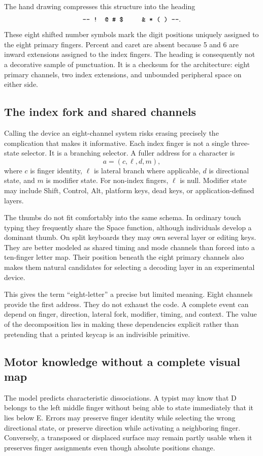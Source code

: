 \documentclass[11pt]{article}
\begin{document}
The hand drawing compresses this structure into the heading
\[
\texttt{--- ! @ \# \$ \qquad \& * ( ) ---}.
\]
These eight shifted number symbols mark the digit positions uniquely assigned to the eight primary fingers. Percent and caret are absent because 5 and 6 are inward extensions assigned to the index fingers. The heading is consequently not a decorative sample of punctuation. It is a checksum for the architecture: eight primary channels, two index extensions, and unbounded peripheral space on either side.

\subsection{The index fork and shared channels}

Calling the device an eight-channel system risks erasing precisely the complication that makes it informative. Each index finger is not a single three-state selector. It is a branching selector. A fuller address for a character is
\[
a=(c,\ell,d,m),
\]
where $c$ is finger identity, $\ell$ is lateral branch where applicable, $d$ is directional state, and $m$ is modifier state. For non-index fingers, $\ell$ is null. Modifier state may include Shift, Control, Alt, platform keys, dead keys, or application-defined layers.

The thumbs do not fit comfortably into the same schema. In ordinary touch typing they frequently share the Space function, although individuals develop a dominant thumb. On split keyboards they may own several layer or editing keys. They are better modeled as shared timing and mode channels than forced into a ten-finger letter map. Their position beneath the eight primary channels also makes them natural candidates for selecting a decoding layer in an experimental device.

This gives the term ``eight-letter'' a precise but limited meaning. Eight channels provide the first address. They do not exhaust the code. A complete event can depend on finger, direction, lateral fork, modifier, timing, and context. The value of the decomposition lies in making these dependencies explicit rather than pretending that a printed keycap is an indivisible primitive.

\subsection{Motor knowledge without a complete visual map}

The model predicts characteristic dissociations. A typist may know that D belongs to the left middle finger without being able to state immediately that it lies below E. Errors may preserve finger identity while selecting the wrong directional state, or preserve direction while activating a neighboring finger. Conversely, a transposed or displaced surface may remain partly usable when it preserves finger assignments even though absolute positions change.
\end{document}
